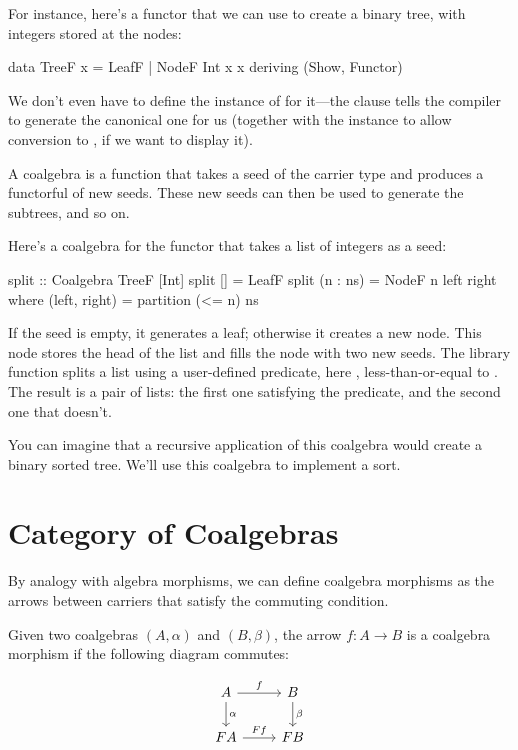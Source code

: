\documentclass[DaoFP]{subfiles}
\begin{document}
For instance, here's a functor that we can use to create a binary tree, with integers stored at the nodes:
\begin{haskell}
data TreeF x = LeafF | NodeF Int x x
  deriving (Show, Functor)
\end{haskell}
We don't even have to define the instance of  for it---the  clause tells the compiler to generate the canonical one for us (together with the  instance to allow conversion to , if we want to display it).

A coalgebra is a function that takes a seed of the carrier type and produces a functorful of new seeds. These new seeds can then be used to generate the subtrees, and so on. 

Here's a coalgebra for the functor  that takes a list of integers as a seed:
\begin{haskell}
split :: Coalgebra TreeF [Int]
split [] = LeafF
split (n : ns) = NodeF n left right
  where
    (left, right) = partition (<= n) ns
\end{haskell}
If the seed is empty, it generates a leaf; otherwise it creates a new node. This node stores the head of the list and fills the node with two new seeds. The library function  splits a list using a user-defined predicate, here , less-than-or-equal to . The result is a pair of lists: the first one satisfying the predicate, and the second one that doesn't. 

You can imagine that a recursive application of this coalgebra would create a binary sorted tree. We'll use this coalgebra to implement a sort.

\section{Category of Coalgebras}

By analogy with algebra morphisms, we can define coalgebra morphisms as the arrows between carriers that satisfy the commuting condition. 

Given two coalgebras $(A, \alpha)$ and $(B, \beta)$, the arrow $f \colon A \to B$ is a coalgebra morphism if the following diagram commutes:

\[
 \begin{tikzcd}
 A 
 \arrow[r, "f"]
 \arrow[d, "\alpha"]
 & B
\arrow[d, "\beta"]
 \\
F  A
 \arrow[r, "F f"]
 & F B
  \end{tikzcd}
\]
\end{document}
